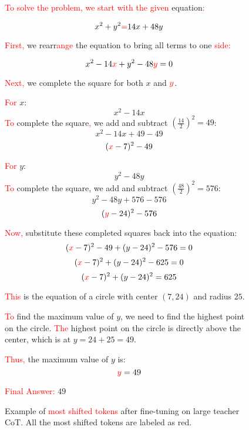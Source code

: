 \begin{figure*}[htbp]
    \centering
\begin{tcolorbox}[title=Example of \textcolor{red}{Most Shifted Tokens} after fine-tuning on large model CoT, promptstyle]
\lstset{
    basicstyle=\normalfont\sffamily\footnotesize,
    breaklines=true,
    frame=none,
    columns=fullflexible,
}


\textcolor{red}{To} \textcolor{red}{solve} \textcolor{red}{the} \textcolor{red}{problem}\textcolor{red}{,} \textcolor{red}{ we} \textcolor{red}{ start} \textcolor{red}{ with} \textcolor{red}{ the} \textcolor{red}{ given} equation\textcolor{red}{:}

\[
x^2 + y^2\textcolor{red}{ =} 14x + 48y
\]

\textcolor{red}{First}\textcolor{red}{,} we rearr\textcolor{red}{ange} the equation to bring all terms to one\textcolor{red}{ side}\textcolor{red}{:}

\[
x^2 - 14\textcolor{red}{x} + y^2 - 48\textcolor{red}{y} = 0
\]

\textcolor{red}{Next}\textcolor{red}{,} we complete the square for both \(x\) and \(\textcolor{red}{y}\).

\textcolor{red}{For} \(x\):
\[
x^2 - 14x
\]
\textcolor{red}{To} complete the square\textcolor{red}{,} we add and subtract \(\left(\frac{14}{2}\right)^2 = 49\):
\[
x^2 - 14x + 49 - 49
\]
\[
(\textcolor{red}{x} - 7)^2 - 49
\]

\textcolor{red}{For} \(y\):
\[
y^2 - 48y
\]
\textcolor{red}{To} complete the square, we add and subtract \(\left(\frac{48}{2}\right)^2 = 576\):
\[
y^2 - 48y + 576 - 576
\]
\[
(\textcolor{red}{y} - 24)^2 - 576
\]

\textcolor{red}{Now}\textcolor{red}{,} substitute these completed squares back into the equation:
\[
(\textcolor{red}{x} - 7)^2 - 49 + (y - 24)^2 - 576 = 0
\]
\[
(\textcolor{red}{x} - 7)^2 + (y - 24)^2 - 625 = 0
\]
\[
(\textcolor{red}{x} - 7)^2 + (y - 24)^2 = 625
\]

\textcolor{red}{This} is the equation of a circle with center \((7, 24)\) and radius \(25\).

\textcolor{red}{To} find the maximum value of \(y\), we need to find the highest point on the circle. \textcolor{red}{The} highest point on the circle is directly above the center, which is at \(y = 24 + 25 = 49\).

\textcolor{red}{Thus}\textcolor{red}{,} the maximum value of \(y\) is:
\[
\textcolor{red}{y} = 49
\]

\textcolor{red}{Final} \textcolor{red}{ Answer}\textcolor{red}{:} \(\boxed{49}\)

\end{tcolorbox}
\caption{Example of \textcolor{red}{most shifted tokens} after fine-tuning on large teacher CoT. All the most shifted tokens are labeled as red.}
    \label{fig: most_shifted_3}
\end{figure*}




